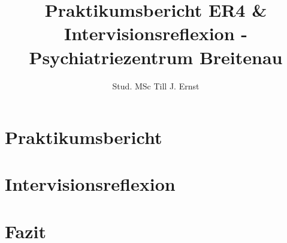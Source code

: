 \documentclass[jou,a4paper,apacite]{apa6}
\title{Praktikumsbericht ER4 \& Intervisionsreflexion - Psychiatriezentrum Breitenau}
\author{Stud. MSc Till J. Ernst}
\affiliation{Applied Psychology ZHAW}
\begin{document}
\maketitle    

\section{Praktikumsbericht}\label{sec:Praktikumsbericht}




\section{Intervisionsreflexion}\label{sec:Intervision}


\section{Fazit}\label{sec:Fazit}


\begin{flushleft}
\nocite{*}
{}
\end{flushleft}
\end{document}
